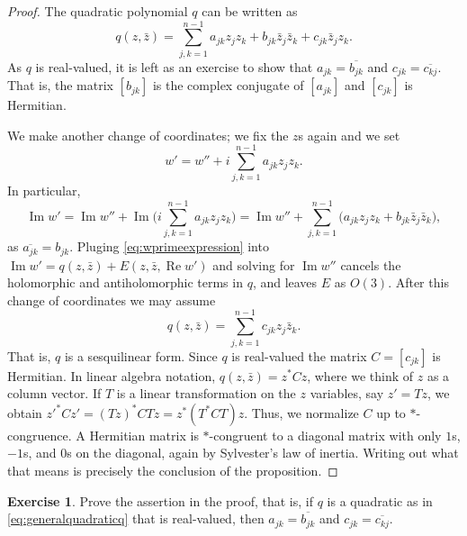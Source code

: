 \documentclass[12pt,openany]{book}
\renewcommand{\Re}{\operatorname{Re}}
\renewcommand{\Im}{\operatorname{Im}}
\theoremstyle{plain}
\theoremstyle{remark}
\theoremstyle{definition}
\newenvironment{exbox}{%
    \def\FrameCommand{\vrule width 1pt \relax\hspace {10pt}}%
    \MakeFramed {\advance \hsize -\width \FrameRestore }%
}{%
    \endMakeFramed
}
\theoremstyle{exercise}
\newtheorem{exercise}{Exercise}[section]
\theoremstyle{example}
\begin{document}
\begin{proof}
The quadratic polynomial $q$ can be written as
\begin{equation} \label{eq:generalquadraticq}
q(z,\bar{z}) =
\sum_{j,k=1}^{n-1}
a_{jk} z_jz_k
+
b_{jk} \bar{z}_j\bar{z}_k
+
c_{jk} \bar{z}_jz_k .
\end{equation}
As $q$ is real-valued, it is left as an exercise to show that $a_{jk} =
\overline{b_{jk}}$ and $c_{jk} = \overline{c_{kj}}$.  That is, the
matrix $[b_{jk}]$ is the complex conjugate of $[a_{jk}]$ and
$[c_{jk}]$ is Hermitian.

We make another change of coordinates; we fix the $z$s again and we set
\begin{equation} \label{eq:wprimeexpression}
w' = w'' + i
\sum_{j,k=1}^{n-1}
a_{jk} z_jz_k .
\end{equation}
In particular,
\begin{equation*}
\Im w'
= \Im w''
+ \Im \biggl(
i
\sum_{j,k=1}^{n-1}
a_{jk} z_jz_k 
\biggr)
=
\Im w''
+
\sum_{j,k=1}^{n-1}
\bigl(
a_{jk} z_jz_k 
+
b_{jk} \bar{z}_j\bar{z}_k 
\bigr) ,
\end{equation*}
as $\overline{a_{jk}} = b_{jk}$.  Pluging
\eqref{eq:wprimeexpression} into $\Im w' = q(z,\bar{z}) + E(z,\bar{z},\Re w')$
and solving for $\Im w''$ cancels the
holomorphic and antiholomorphic terms in $q$, and leaves $E$ as $O(3)$.
After this change of coordinates we may assume
\begin{equation*}
q(z,\bar{z}) = \sum_{j,k=1}^{n-1} c_{jk} z_j \bar{z}_k .
\end{equation*}
That is, $q$ is a sesquilinear form.  Since $q$ is real-valued the matrix
$C = [ c_{jk} ]$ is Hermitian.  In linear algebra notation,
$q(z,\bar{z}) = z^*Cz$,
where %
we think of $z$ as a column vector.
If $T$ is a linear transformation on the $z$ variables, say $z'=Tz$, we
obtain ${z'}^*Cz' = {(Tz)}^*CTz = z^* ( T^*CT) z$.  Thus, we normalize $C$
up to $*$-congruence.  A Hermitian matrix
is $*$-congruent to a diagonal matrix with only $1$s, $-1$s, and $0$s on the
diagonal, again by Sylvester's law of inertia.  Writing out what that means is precisely the conclusion of the
proposition.
\end{proof}

\begin{exbox}
\begin{exercise}
Prove the assertion in the proof, that is, if $q$ is a quadratic as in
\eqref{eq:generalquadraticq} that is real-valued, then
 $a_{jk} = \overline{b_{jk}}$ and $c_{jk} = \overline{c_{kj}}$.
\pagebreak[3]
\end{exercise}
\end{exbox}
\end{document}

